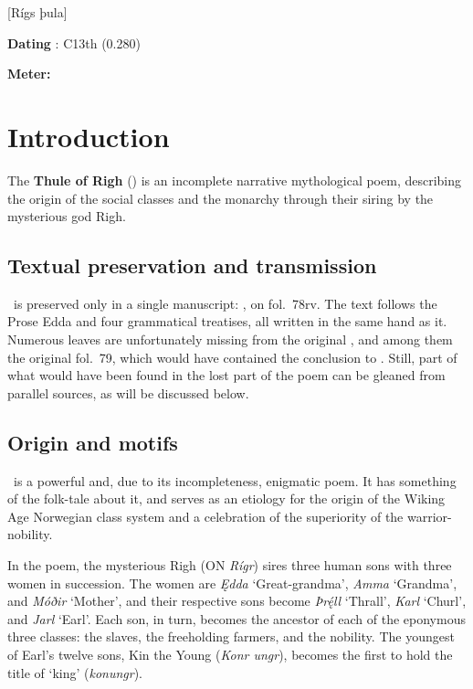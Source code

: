 [Rígs þula]

\begin{flushright}%
\textbf{Dating} \parencite{Sapp2022}: C13th (0.280)

\textbf{Meter:} \Fornyrdislag%
\end{flushright}

\section{Introduction}

The \textbf{Thule of Righ} (\Rigsthula) is an incomplete narrative mythological poem, describing the origin of the social classes and the monarchy through their siring by the mysterious god Righ.

\subsection{Textual preservation and transmission}

\Rigsthula\ is preserved only in a single manuscript: \Wormianus, on fol.~78rv.  The text follows the Prose Edda and four grammatical treatises, all written in the same hand as it.
Numerous leaves are unfortunately missing from the original \Wormianus, and among them the original fol.~79, which would have contained the conclusion to \Rigsthula.  Still, part of what would have been found in the lost part of the poem can be gleaned from parallel sources, as will be discussed below.


\subsection{Origin and motifs}

\Rigsthula\ is a powerful and, due to its incompleteness, enigmatic poem.  It has something of the folk-tale about it, and serves as an etiology for the origin of the Wiking Age Norwegian class system and a celebration of the superiority of the warrior-nobility.

In the poem, the mysterious Righ (ON \emph{Rígr}) sires three human sons with three women in succession.  The women are \emph{Ędda} ‘Great-grandma’, \emph{Amma} ‘Grandma’, and \emph{Móðir} ‘Mother’, and their respective sons become \emph{Þrę́ll} ‘Thrall’, \emph{Karl} ‘Churl’, and \emph{Jarl} ‘Earl’.  Each son, in turn, becomes the ancestor of each of the eponymous three classes: the slaves, the freeholding farmers, and the nobility.  The youngest of Earl’s twelve sons, Kin the Young (\emph{Konr ungr}), becomes the first to hold the title of ‘king’ (\emph{konungr}).


